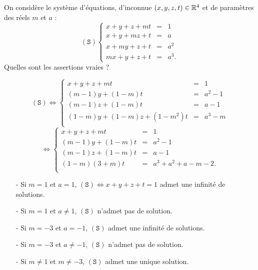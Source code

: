 \begin{question}
On considère le système d'équations, d'inconnue $(x,y,z,t)\in \mathbb{R}^4$  et de paramètres des réels $m$ et $a$ : 
$$(\mathtt{S})  
\left\{\begin{array}{rcc}
x+y+z+mt&=&1\\
x+y+mz+t&=&a\\ 
x+my+z+t&=&a^2\\
mx+y+z+t&=&a^3.\end{array}\right.$$
Quelles sont les assertions vraies ?
\begin{answers}  
\end{answers}
\begin{explanations} 
$$(\mathtt{S}) \Leftrightarrow  
\left\{\begin{array}{rcc}
x+y+z+mt&=&1\\
(m-1)y+(1-m)t&=&a^2-1\\ 
(m-1)z+(1-m)t&=&a-1 \\
(1-m)y+(1-m)z+(1-m^2)t&=&a^3-m\\
\end{array}\right.$$
$$ \Leftrightarrow  
\left\{\begin{array}{rcc}
x+y+z+mt&=&1\\
(m-1)y+(1-m)t&=&a^2-1\\ 
(m-1)z+(1-m)t&=&a-1 \\
(1-m)(3+m)t&=&a^3+a^2+a-m-2.\\
\end{array}\right. $$
\begin{enumerate}
\item[-]Si $m=1$ et $a=1$,  $(\mathtt{S})  \Leftrightarrow  x+y+z+t=1 $ admet une infinité de solutions.
\item[-]Si $m=1$ et $a\neq 1$,  $(\mathtt{S})$ n'admet pas de solution.
\item[-]Si $m=-3$ et $a=-1$,  $(\mathtt{S})$ admet une infinité de solutions.
\item[-]Si $m=-3$ et $a\neq -1$,  $(\mathtt{S})$ n'admet pas de solution.
\item[-]Si $m\neq 1$ et $m\neq -3$, $(\mathtt{S})$ admet une unique solution.
\end{enumerate}
\end{explanations}
\end{question}


